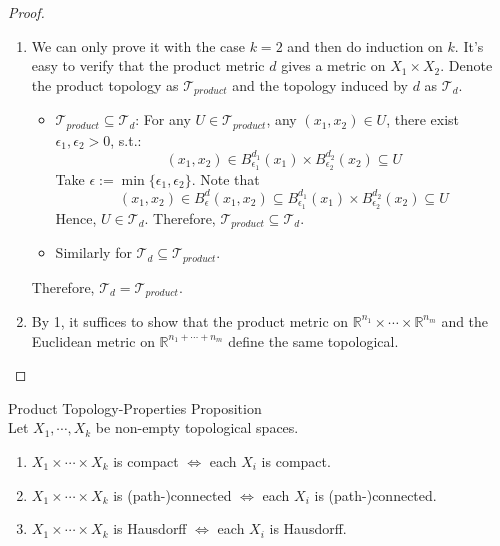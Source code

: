 \begin{proof}
    \begin{enumerate}
        \item We can only prove it with the case $k=2$ and then do induction on $k$. It's easy to verify that the product metric $d$ gives a metric on $X_1 \times X_2$. Denote the product topology as $\mathcal{T}_{product}$ and the topology induced by $d$ as $\mathcal{T}_d$.
        \begin{itemize}
            \item $\mathcal{T}_{product} \subseteq \mathcal{T}_d$: For any $U \in \mathcal{T}_{product}$, any $(x_1,x_2) \in U$, there exist $\epsilon_1 ,\epsilon_2 >0$, s.t.:
            $$(x_1,x_2) \in B_{\epsilon_1}^{d_1} (x_1) \times B_{\epsilon_2}^{d_2} (x_2) \subseteq U$$
            Take $\epsilon:= \min \{\epsilon_1 ,\epsilon_2 \}$. Note that
            $$(x_1 ,x_2) \in B_{\epsilon}^d (x_1,x_2) \subseteq B_{\epsilon_1}^{d_1} (x_1) \times B_{\epsilon_2}^{d_2} (x_2) \subseteq U$$
            Hence, $U \in \mathcal{T}_d$. Therefore, $\mathcal{T}_{product} \subseteq \mathcal{T}_d$.

            \item Similarly for $\mathcal{T}_{d} \subseteq \mathcal{T}_{product}$.
        \end{itemize}
        Therefore, $\mathcal{T}_{d} = \mathcal{T}_{product}$.

        \item By 1, it suffices to show that the product metric on $\mathbb{R}^{n_1} \times \cdots \times \mathbb{R}^{n_m}$ and the Euclidean metric on $\mathbb{R}^{n_1+\cdots+ n_m}$ define the same topological.
    \end{enumerate}
\end{proof}

\begin{proposition}{Product Topology-Properties Proposition}\\
Let $X_1,\cdots, X_k$ be non-empty topological spaces.
\begin{enumerate}
    \item $X_1 \times \cdots \times X_k$ is compact $\Leftrightarrow$ each $X_i$ is compact.
    \item $X_1 \times \cdots \times X_k$ is (path-)connected $\Leftrightarrow$ each $X_i$ is (path-)connected.
    \item $X_1 \times \cdots \times X_k$ is Hausdorff $\Leftrightarrow$ each $X_i$ is Hausdorff.
\end{enumerate}
\end{proposition}


